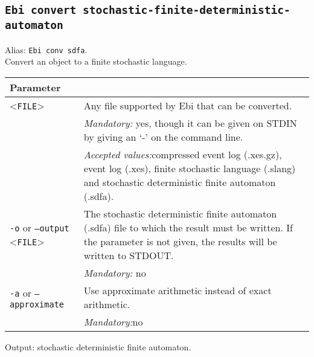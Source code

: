 {\subsection{\texttt{Ebi convert stochastic-finite-deterministic-automaton}}
\label{command:Ebi convert stochastic-finite-deterministic-automaton}
Alias: \texttt{Ebi conv sdfa}.\\
Convert an object to a finite stochastic language.\\
\begin{tabularx}{\linewidth}{lX}
\toprule
Parameter \\\midrule
<\texttt{FILE}>&Any file supported by Ebi that can be converted.\\
&\textit{Mandatory:} \quad yes, though it can be given on STDIN by giving an `-' on the command line.\\
&\textit{Accepted values:}\quad compressed event log (.xes.gz), event log (.xes), finite stochastic language (.slang) and stochastic deterministic finite automaton (.sdfa).\\
\texttt{-o} or \texttt{--output} <\texttt{FILE}> &
The stochastic deterministic finite automaton (.sdfa) file to which the result must be written. If the parameter is not given, the results will be written to STDOUT.\\
&\textit{Mandatory:} \quad no\\
\texttt{-a} or \texttt{--approximate} & Use approximate arithmetic instead of exact arithmetic.\\
&\textit{Mandatory:}\quad no\\
\bottomrule
\end{tabularx}
Output: stochastic deterministic finite automaton.
}
